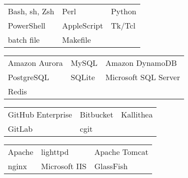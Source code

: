 \documentclass[a4paper,12pt]{memoir} %
\begin{document}



{\begin{tabular}{p{} p{} p{}}
	\bluebullet Bash, sh, Zsh    & \bluebullet Perl              & \bluebullet Python                 \\
	\bluebullet PowerShell       & \bluebullet AppleScript       & \bluebullet Tk/Tcl                 \\
	\bluebullet batch file       & \bluebullet Makefile \\
\end{tabular}}


{\begin{tabular}{p{} p{} p{}}
	\bluebullet Amazon Aurora    & \bluebullet MySQL             & \bluebullet Amazon DynamoDB        \\
	\bluebullet PostgreSQL       & \bluebullet SQLite            & \bluebullet Microsoft SQL Server   \\
	\bluebullet Redis \\
\end{tabular}}


{\begin{tabular}{p{} p{} p{}}
	\bluebullet GitHub Enterprise& \bluebullet Bitbucket         & \bluebullet Kallithea              \\
	\bluebullet GitLab           & \bluebullet cgit \\
\end{tabular}}


{\begin{tabular}{p{} p{} p{}}
	\bluebullet Apache           & \bluebullet lighttpd          & \bluebullet Apache Tomcat          \\
	\bluebullet nginx            & \bluebullet Microsoft IIS     & \bluebullet GlassFish              \\
\end{tabular}}
\end{document}
